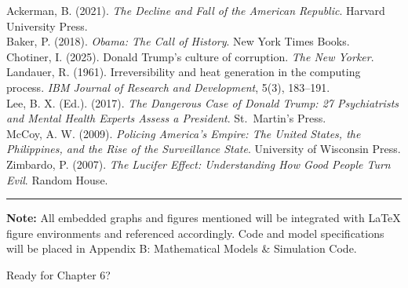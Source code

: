 \documentclass[
]{article}
\begin{document}
Ackerman, B. (2021). \emph{The Decline and Fall of the American Republic}. Harvard University Press.\\
Baker, P. (2018). \emph{Obama: The Call of History}. New York Times Books.\\
Chotiner, I. (2025). Donald Trump's culture of corruption. \emph{The New Yorker}.\\
Landauer, R. (1961). Irreversibility and heat generation in the computing process. \emph{IBM Journal of Research and Development}, 5(3), 183--191.\\
Lee, B. X. (Ed.). (2017). \emph{The Dangerous Case of Donald Trump: 27 Psychiatrists and Mental Health Experts Assess a President}. St.~Martin's Press.\\
McCoy, A. W. (2009). \emph{Policing America's Empire: The United States, the Philippines, and the Rise of the Surveillance State}. University of Wisconsin Press.\\
Zimbardo, P. (2007). \emph{The Lucifer Effect: Understanding How Good People Turn Evil}. Random House.

\begin{center}\rule{0.5\linewidth}{0.5pt}\end{center}

\textbf{Note:} All embedded graphs and figures mentioned will be integrated with LaTeX figure environments and referenced accordingly. Code and model specifications will be placed in Appendix B: Mathematical Models \& Simulation Code.

Ready for Chapter 6?
\end{document}
